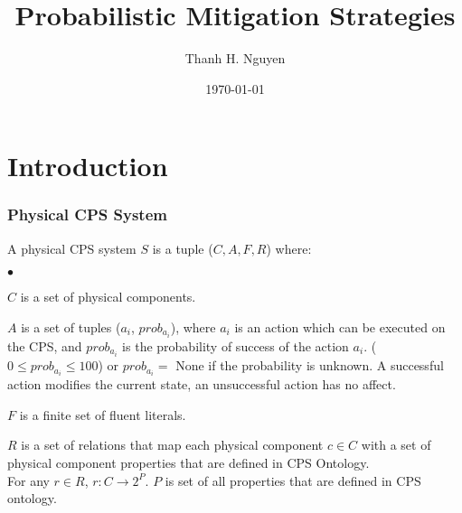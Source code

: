 \documentclass{beamer}
\title[Truthworthiness value]{Probabilistic Mitigation Strategies} %
\author{Thanh H. Nguyen} %
\institute[NMSU] %
{
New Mexico State University \\ %
\medskip
\textit{tnguyen@cs.nmsu.edu} %
}
\date{\today} %
\begin{document}
\begin{frame}
\titlepage %
\end{frame}




\section{Introduction} 

\begin{frame}
	\frametitle{Physical CPS System}
	\begin{definition}
		\label{def:physical_CPS_system} 
		A physical CPS system $S$ is a tuple ($C, A, F, R$) where:
		\begin{list}{$\bullet$}{\itemsep=0pt \parsep=1pt \topsep=1pt \leftmargin=12pt} 
			\item $C$ is a set of physical components.
			\item $A$ is a set of tuples ($a_i$, $prob_{a_i}$), where $a_i$ is an action which can be executed on the CPS, and $prob_{a_i}$ is the probability of success of the action $a_i$. ($0 \leq prob_{a_i} \leq 100$) or $prob_{a_i} = $ None if the probability is unknown. A successful action modifies the current state, an unsuccessful action has no affect.
			\item $F$ is a finite set of fluent literals.
			\item $R$ is a set of relations that map each physical component $c \in C$ with a set of physical component properties that are defined in CPS Ontology.  \\
			For any $r \in R$, $r : C \longrightarrow 2^{P}$. $P$ is set of all properties that are defined in CPS ontology. 	 
		\end{list}
	\end{definition}
\end{frame}
\end{document}
